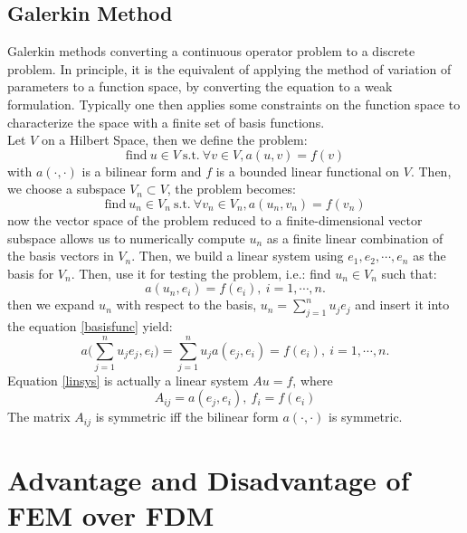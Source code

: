 \documentclass[a4paper,12pt]{article}
\begin{document}
\subsection{Galerkin Method}
Galerkin methods converting a continuous operator problem to a discrete problem. In principle, it is the equivalent of applying the method of variation of parameters to a function space, by converting the equation to a weak formulation. Typically one then applies some constraints on the function space to characterize the space with a finite set of basis functions.\\
Let $V$ on a Hilbert Space, then we define the problem:
\begin{equation}
\text{find}\ u \in V\ \text{s.t.}\ \forall v \in V, a(u,v) = f(v)
\end{equation}
with $a(\cdot,\cdot)$ is a bilinear form and $f$ is a bounded linear functional on $V$. Then, we choose a subspace $V_n \subset V$, the problem becomes:
\begin{equation}
\text{find}\ u_n \in V_n\ \text{s.t.}\ \forall v_n \in V_n, a(u_n,v_n) = f(v_n)
\end{equation}
now the vector space of the problem reduced to a finite-dimensional vector subspace allows us to numerically compute $u_n$ as a finite linear combination of the basis vectors in $V_n$. Then, we build a linear system using $e_1,e_2,\cdots,e_n$ as the basis for $V_n$. Then, use it for testing the problem, i.e.: find $u_n\in V_n$ such that:
\begin{equation}\label{basisfunc}
a(u_n,e_i) = f(e_i),\ i=1,\cdots,n.
\end{equation}
then we expand $u_n$ with respect to the basis, $u_n = \sum_{j=1}^n u_j e_j$ and insert it into the equation \ref{basisfunc} yield:
\begin{equation}\label{linsys}
a\bigg( \sum_{j=1}^{n}u_j e_j,e_i \bigg) = \sum_{j=1}^{n} u_j a(e_j,e_i) = f(e_i),\ i=1,\cdots,n.
\end{equation}
Equation \ref{linsys} is actually a linear system $Au = f$, where
\begin{equation}
A_{ij} = a(e_j,e_i),\ f_i=f(e_i)
\end{equation}
The matrix $A_{ij}$ is symmetric iff the bilinear form $a(\cdot,\cdot)$ is symmetric.
\section{Advantage and Disadvantage of FEM over FDM}
\end{document}
